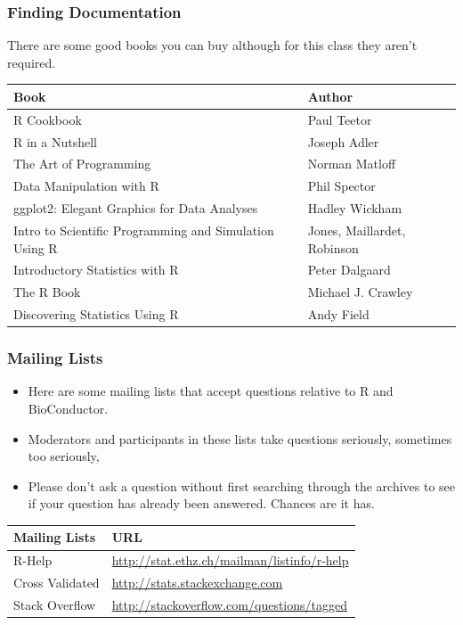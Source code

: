 \documentclass{beamer}
\begin{document}
\begin{frame}[fragile]
\frametitle{Finding Documentation}
There are some good books you can buy although for this class they aren't required.
\newline
\footnotesize

\begin{tabular}{| l | l |}
  \hline         
  \textbf{Book} & \textbf{Author} \\ \hline
  R Cookbook & Paul Teetor \\ \hline
  R in a Nutshell & Joseph Adler \\ \hline
  The Art of Programming & Norman Matloff \\ \hline
  Data Manipulation with R & Phil Spector \\ \hline
  ggplot2: Elegant Graphics for Data Analyses & Hadley Wickham \\ \hline
  Intro to Scientific Programming and Simulation Using R & Jones, Maillardet, Robinson \\ \hline
  Introductory Statistics with R & Peter Dalgaard \\ \hline
  The R Book & Michael J. Crawley \\ \hline
  Discovering Statistics Using R & Andy Field \\ \hline
  \hline  
\end{tabular}

\end{frame}


\begin{frame}[fragile]
\frametitle{Mailing Lists}
\begin{itemize}
\item Here are some mailing lists that accept questions relative to R and BioConductor. 
\item Moderators and participants in these lists take questions seriously, sometimes too seriously, \item Please don't ask a question without first searching through the archives to see if your question has already been answered. Chances are it has.
\end{itemize}
\small

\begin{center}
\begin{tabular}{| l | l |}
  \hline         
  \textbf{Mailing Lists} & \textbf{URL} \\ \hline
  R-Help & \url{http://stat.ethz.ch/mailman/listinfo/r-help} \\ \hline
  Cross Validated & \url{http://stats.stackexchange.com} \\ \hline
  Stack Overflow & \url{http://stackoverflow.com/questions/tagged} \\ \hline
  \hline  
\end{tabular}
\end{center}
\end{frame}
\end{document}
